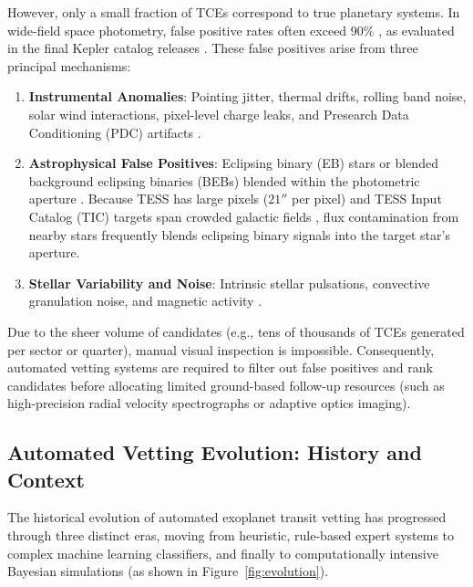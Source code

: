 However, only a small fraction of TCEs correspond to true planetary systems. In wide-field space photometry, false positive rates often exceed 90\% \citep{Fressin2013}, as evaluated in the final Kepler catalog releases \citep{Mullally2015, Coughlin2016, Thompson2018}. These false positives arise from three principal mechanisms:
\begin{enumerate}
\item \textbf{Instrumental Anomalies}: Pointing jitter, thermal drifts, rolling band noise, solar wind interactions, pixel-level charge leaks, and Presearch Data Conditioning (PDC) artifacts \citep{Smith2012, Stumpe2012}.
\item \textbf{Astrophysical False Positives}: Eclipsing binary (EB) stars \citep{Slawson2011, Prsa2011, Kirk2016} or blended background eclipsing binaries (BEBs) blended within the photometric aperture \citep{Santerne2012, Bryson2013, Sullivan2015, Colon2012}. Because TESS has large pixels ($21''$ per pixel) and TESS Input Catalog (TIC) targets span crowded galactic fields \citep{Stassun2018, Stassun2019}, flux contamination from nearby stars frequently blends eclipsing binary signals into the target star's aperture.
\item \textbf{Stellar Variability and Noise}: Intrinsic stellar pulsations, convective granulation noise, and magnetic activity \citep{Meunier2010, McQuillan2013, McQuillan2014, Reinhold2013, Aigrain2012}.
\end{enumerate}

Due to the sheer volume of candidates (e.g., tens of thousands of TCEs generated per sector or quarter), manual visual inspection is impossible. Consequently, automated vetting systems are required to filter out false positives and rank candidates before allocating limited ground-based follow-up resources (such as high-precision radial velocity spectrographs or adaptive optics imaging).

\subsection{Automated Vetting Evolution: History and Context} \label{sec:vetting_history}
The historical evolution of automated exoplanet transit vetting has progressed through three distinct eras, moving from heuristic, rule-based expert systems to complex machine learning classifiers, and finally to computationally intensive Bayesian simulations (as shown in Figure~\ref{fig:evolution}).

